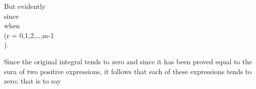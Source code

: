 But evidently
\\[ \begin{align*}
  &
  \int_{-\pi}^{\pi}\!
  \left\{
    f(x)
    -
    \frac{1}{m}
    \sum_{n=0}^{m-1} S_{n}(x)
  \right\}^{2} \, d x
  \\
  &\quad
  \int_{-\pi}^{\pi}\!
  \left\{
    f(x)
    -
    \sum_{n=0}^{m-1}
    \frac{m-n}{m}
    A_{n}(x)
  \right\}^{2} \, d x
  \\
  &\quad
  \int_{-\pi}^{\pi}\!
  \left\{
    f(x)
    -
    \sum_{n=0}^{m-1}
    A_{n}(x)
    +
    \sum_{n=0}^{m-1}
    \frac{n}{m}
    A_{n}(x)
  \right\}^{2} \, d x
  \\
  &\quad
  \int_{-\pi}^{\pi}\!
  \left\{
    f(x)
    -
    \sum_{n=0}^{m-1}
    A_{n}(x)
  \right\}^{2} \, d x
  +
  \int_{-\pi}^{\pi}\!
  \left\{
    \sum_{n=0}^{m-1}
    \frac{n}{m}
    A_{n}(x)
  \right\}^{2} \, d x
  \\
  &\quad\quad
  +
  2
  \int_{-\pi}^{\pi}\!
  \left\{
    f(x)
    -
    \sum_{n=0}^{m-1}
    A_{n}(x)
  \right\}
  \cdot
  \left\{
    \sum_{n=0}^{m-1}
    \frac{n}{m}
    A_{n}(x)
  \right\} \, d x
  \\
  &\quad
    \int_{-\pi}^{\pi}\!
    \left\{
      f(x)
      -
      \sum_{n=0}^{m-1}
      A_{n}(x)
    \right\}^{2} \, d x
    +
    \frac{\pi}{m^{2}}
    \sum_{n=0}^{m-1}
    n^{2} (a_{n}^{2} + b_{n}^{2}),
\end{align*} \\]
%
%
since
\\[ 
\int_{-\pi}^{\pi}\!
f(x) A_{r}(x) \, d x
=
\int_{-\pi}^{\pi}\!
\left\{
  \sum_{n=0}^{m-1}
  A_{n}(x)
\right\}
A_{r}(x)
\, d x
\\] 
when \\(r = 0,1,2,\ldots,m-1\\).

Since the original integral tends to zero and since it has been proved
equal to the sura of two positive expressions, it follows that each of
these expressions tends to zero; that is to say
\\[ 
\int_{-\pi}^{\pi}\!
\left\{
  f(x)
  -
  \sum_{n=0}^{m-1}
  A_{n}(x)
\right\}^{2} \, d x
\rightarrow
0.
\\] 

